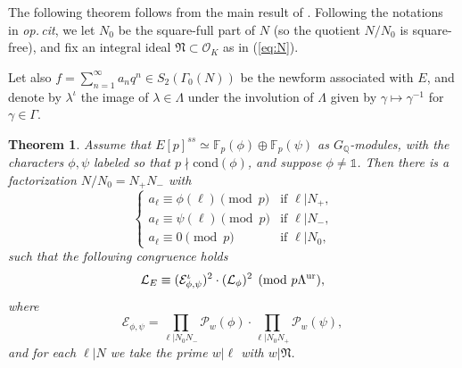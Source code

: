 \documentclass[10pt]{amsart}
\numberwithin{equation}{section}
\newtheorem{theorem}{Theorem}
\theoremstyle{definition}
\theoremstyle{remark}
\newcommand{\bQ}{\mathbb{Q}}
\begin{document}
The following theorem follows from the main result of \cite{kriz}. Following the notations in \emph{op.\,cit},
we let $N_0$ be the square-full part of $N$ (so the quotient $N/N_0$ is square-free), and fix an integral ideal $\mathfrak{N}\subset\mathcal{O}_K$ as in (\ref{eq:N}).

Let also $f=\sum_{n=1}^\infty a_nq^n\in S_2(\Gamma_0(N))$ be the newform associated with $E$, and denote by $\lambda^\iota$ the image of $\lambda\in\Lambda$ under the involution of $\Lambda$ given by $\gamma\mapsto\gamma^{-1}$ for $\gamma\in\Gamma$. 


\begin{theorem}\label{thm:kriz}
Assume that $E[p]^{ss}\simeq\mathbb{F}_p(\phi)\oplus\mathbb{F}_p(\psi)$ as $G_\bQ$-modules,
with the characters $\phi, \psi$ labeled so that $p\nmid\mathrm{cond}(\phi)$, and suppose $\phi\neq\mathds{1}$.
Then there is a factorization $N/N_0=N_+N_-$ with
\[
\begin{cases}
a_\ell\equiv\phi(\ell)\pmod{p}&\textrm{if $\ell\vert N_+$,}\\
a_\ell\equiv\psi(\ell)\pmod{p}&\textrm{if $\ell\vert N_-$,}\\
a_\ell\equiv 0\pmod{p}&\textrm{if $\ell\vert N_0,$}
\end{cases}
\]
such that the following congruence holds
\[
\mathcal{L}_E\equiv(\mathcal{E}_{\phi,\psi}^\iota)^2\cdot(\mathcal{L}_\phi)^2\pmod{p\Lambda^{\rm ur}},
\]
where 
\[
\mathcal{E}_{\phi,\psi}=\prod_{\ell\vert N_0N_-}\mathcal{P}_w(\phi)\cdot\prod_{\ell\vert N_0N_+}\mathcal{P}_w(\psi),
\] 
and for each $\ell\vert N$ we take the prime $w\vert\ell$ with $w\vert\mathfrak{N}$.
\end{theorem}
\end{document}

